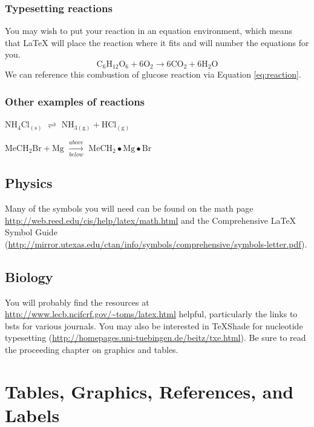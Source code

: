 \documentclass[12pt,twoside]{reedthesis}
\theoremstyle{definition}
\theoremstyle{definition}
\theoremstyle{definition}
\theoremstyle{remark}
\begin{document}
\subsection{Typesetting reactions}\label{typesetting-reactions}

You may wish to put your reaction in an equation environment, which
means that LaTeX will place the reaction where it fits and will number
the equations for you.
\begin{equation}
  \mathrm{C_6H_{12}O_6  + 6O_2} \longrightarrow \mathrm{6CO_2 + 6H_2O}
  \label{eq:reaction}
\end{equation}
We can reference this combustion of glucose reaction via Equation
\eqref{eq:reaction}.

\subsection{Other examples of
reactions}\label{other-examples-of-reactions}

\(\mathrm{NH_4Cl_{(s)}}\) \(\rightleftharpoons\)
\(\mathrm{NH_{3(g)}+HCl_{(g)}}\)

\noindent \(\mathrm{MeCH_2Br + Mg}\) \(\xrightarrow[below]{above}\)
\(\mathrm{MeCH_2\bullet Mg \bullet Br}\)

\section{Physics}\label{physics}

Many of the symbols you will need can be found on the math page
\url{http://web.reed.edu/cis/help/latex/math.html} and the Comprehensive
LaTeX Symbol Guide
(\url{http://mirror.utexas.edu/ctan/info/symbols/comprehensive/symbols-letter.pdf}).

\section{Biology}\label{biology}

You will probably find the resources at
\url{http://www.lecb.ncifcrf.gov/~toms/latex.html} helpful, particularly
the links to bsts for various journals. You may also be interested in
TeXShade for nucleotide typesetting
(\url{http://homepages.uni-tuebingen.de/beitz/txe.html}). Be sure to
read the proceeding chapter on graphics and tables.

\chapter{Tables, Graphics, References, and Labels}\label{ref-labels}
\end{document}
